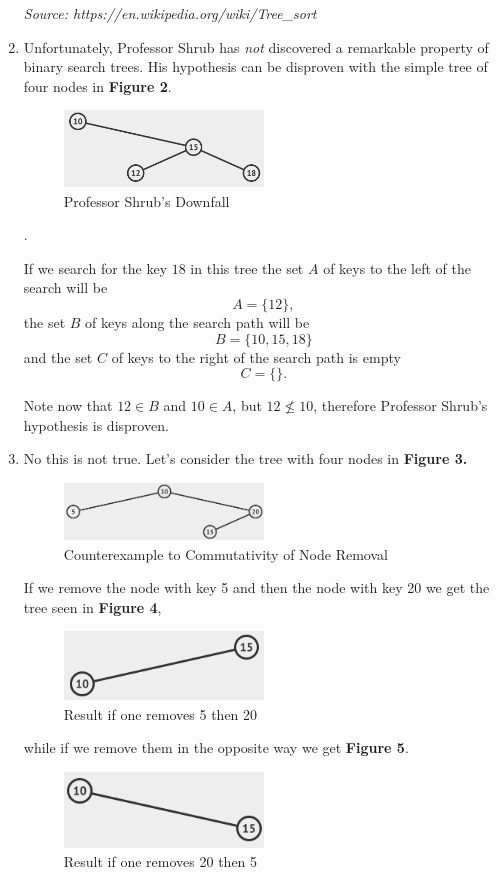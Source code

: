 \documentclass{article}
\begin{document}
\begin{enumerate}
		\textit{Source: https://en.wikipedia.org/wiki/Tree\_sort}			
		
		\item Unfortunately, Professor Shrub has  \textit{not }discovered a remarkable property of binary search trees. His hypothesis can be disproven with the simple tree of four nodes in \textbf{Figure 2}.
		
		\begin{figure}[h]
			\centering
			\includegraphics[width=0.5\textwidth]{7.png}
			\caption{Professor Shrub's Downfall}
		\end{figure}.
		
		If we search for the key $18$ in this tree the set $A$ of keys to the left of the search will be
		\[  A = \{12\}, \]
		the set $B$ of keys along the search path will be
		\[  B = \{10, 15, 18  \}  \]
		and the set $C$ of keys to the right of the search path is empty
		\[  C = \{\}.  \]
		
		Note now that $12 \in B$ and $10 \in A$, but $12 \nleq 10$, therefore Professor Shrub's hypothesis is disproven. 
		
		\item No this is not true. Let's consider the tree with four nodes in \textbf{Figure 3. }
		\begin{figure}[h]
			\centering
			\includegraphics[width=0.5\textwidth]{81.png}
			\caption{Counterexample to Commutativity of Node Removal}
		\end{figure}
		If we remove the node with key 5 and then the node with key 20 we get the tree seen in \textbf{Figure 4},
		\begin{figure}[h]
			\centering
			\includegraphics[width=0.5\textwidth]{83.png}
			\caption{Result if one removes 5 then 20}
		\end{figure}
		while if we remove them in the opposite way we get \textbf{Figure 5}.
		\begin{figure}[h]
			\centering
			\includegraphics[width=0.5\textwidth]{82.png}
			\caption{Result if one removes 20 then 5}
		\end{figure}
		\end{enumerate}
\end{document}

